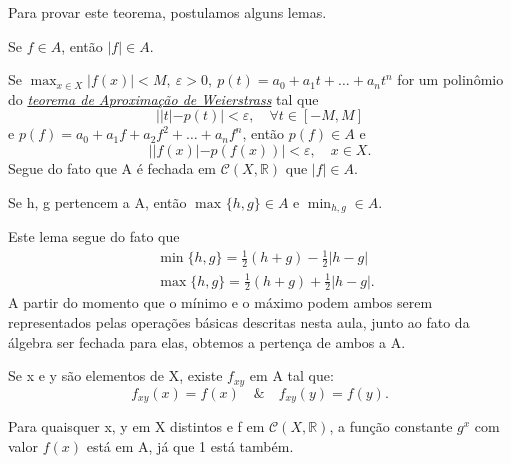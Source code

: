 \documentclass[../analysis_notes.tex]{subfiles}
\begin{document}
\begin{proof*}

	Para provar este teorema,  postulamos alguns lemas.
	\begin{lemma*}
		Se \(f\in A\), então \(|f|\in A\).
	\end{lemma*}
	\begin{proof*}
		Se \(\max_{x\in X}|f(x)| < M,\:\varepsilon >0,\: p(t) = a_{0}+a_{1}t+\dotsc +a_{n}t^{n}\) for um polinômio do \hyperlink{weierstrass-approximation}{\textit{teorema de Aproximação de Weierstrass}} tal que
		\[
			||t| - p(t)| < \varepsilon , \quad \forall t\in [-M, M]
		\]
		e \(p(f) = a_{0}+a_{1}f + a_{2}f^{2}+\dotsc +a_{n}f^{n}\), então \(p(f)\in A\) e
		\[
			||f(x)| - p(f(x))| < \varepsilon ,\quad x\in X.
		\]
		Segue do fato que A é fechada em \(\mathcal{C}(X, \mathbb{R})\) que \(|f|\in A\). \qedsymbol
	\end{proof*}
	\begin{lemma*}
		Se h, g pertencem a A, então \(\max_{}\{h, g\}\in A\) e \(\min_{h, g}\in A\).
	\end{lemma*}
	\begin{proof*}
		Este lema segue do fato que
		\begin{align*}
			 & \min_{}\{h, g\}=\frac{1}{2}(h+g)-\frac{1}{2}|h-g|  \\
			 & \max_{}\{h, g\}=\frac{1}{2}(h+g)+\frac{1}{2}|h-g|.
		\end{align*}
		A partir do momento que o mínimo e o máximo podem ambos serem representados pelas operações básicas descritas nesta aula, junto ao fato da álgebra ser fechada para elas, obtemos a pertença de ambos a A. \qedsymbol
	\end{proof*}
	\begin{lemma*}
		Se x e y são elementos de X, existe \(f_{xy}\) em A tal que:
		\[
			f_{xy}(x)=f(x)\quad\&\quad f_{xy}(y)=f(y).
		\]
	\end{lemma*}
	\begin{proof*}
		Para quaisquer x, y em X distintos e f em \(\mathcal{C}(X, \mathbb{R})\), a função constante \(g^{x}\) com valor \(f(x)\) está em A, já que 1 está também.


\end{proof*}
\end{proof*}
\end{document}
